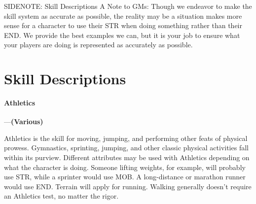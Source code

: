 \documentclass[oneside,11pt,english]{book}
\begin{document}
SIDENOTE: Skill Descriptions %
A Note to GMs: Though we endeavor to make the skill system as accurate as possible, the reality may be 
a situation makes more sense for a character to use their STR when doing something rather than their 
END. We provide the best examples we can, but it is your job to ensure what your players are doing is 
represented as accurately as possible. 

\section{Skill Descriptions}
\paragraph{\label{skill:Athletics}Athletics}---\quad\textbf{(Various)}\par%
Athletics is the skill for moving, jumping, and performing other feats of physical prowess. Gymnastics, sprinting, jumping, and other classic physical activities fall within its purview. Different attributes may be used with Athletics depending on what the character is doing. Someone lifting weights, for example, will probably use STR, while a sprinter would use MOB. A long-distance or marathon runner would use END. Terrain will apply for running. Walking generally doesn’t require an Athletics test, no matter the rigor.
\end{document}
